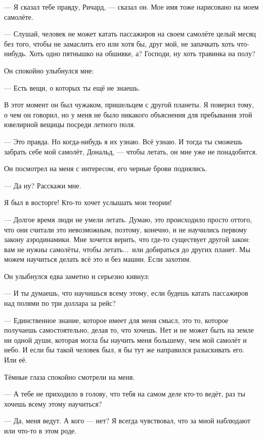 --- Я сказал тебе правду, Ричард, --- сказал он. Мое имя тоже нарисовано на моем самолёте.

--- Слушай, человек не может катать пассажиров на своем самолёте целый месяц без того, чтобы не замаслить его или хотя бы, друг мой, не запачкать хоть что-нибудь. Хоть одно пятнышко на обшивке, а? Господи, ну хоть травинка на полу?

Он спокойно улыбнулся мне:

--- Есть вещи, о которых ты ещё не знаешь.

В этот момент он был чужаком, пришельцем с другой планеты. Я поверил тому, о чем он говорил, но у меня не было никакого объяснения для пребывания этой ювелирной вещицы посреди летного поля.

--- Это правда. Но когда-нибудь я их узнаю. Всё узнаю. И тогда ты сможешь забрать себе мой самолёт, Дональд, --- чтобы летать, он мне уже не понадобится.

Он посмотрел на меня с интересом, его черные брови поднялись.

--- Да ну? Расскажи мне.

Я был в восторге! Кто-то хочет услышать мои теории!

--- Долгое время люди не умели летать. Думаю, это происходило просто оттого, что они считали это
невозможным, поэтому, конечно, и не научились первому закону аэродинамики. Мне хочется верить,
что где-то существует другой закон: вам не нужны самолёты, чтобы летать...\ или добираться до
других планет. Мы можем научиться делать всё это и без машин. Если захотим.

Он улыбнулся едва заметно и серьезно кивнул:

--- И ты думаешь, что научишься всему этому, если будешь катать пассажиров над полями по три доллара за рейс?

--- Единственное знание, которое имеет для меня смысл, это то, которое получаешь самостоятельно,
делая то, что хочешь. Нет и не может быть на земле ни одной души, которая могла бы научить меня
большему, чем мой самолёт и небо. И если бы такой человек был, я бы тут же направился разыскивать
его. Или её.

Тёмные глаза спокойно смотрели на меня.

--- А тебе не приходило в голову, что тебя на самом деле кто-то ведёт, раз ты хочешь всему этому научиться?

--- Да, меня ведут. А кого --- нет? Я всегда чувствовал, что за мной наблюдают или что-то в этом роде.

